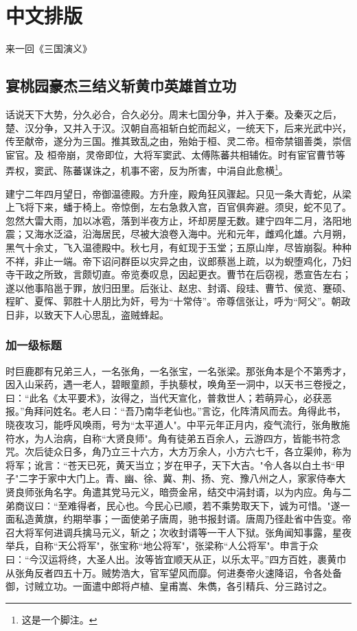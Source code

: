 \documentclass[UTF8,a4paper,twoside,zihao=-4]{ctexrep}
\begin{document}


\tableofcontents\newpage\mbox{}\thispagestyle{empty}\newpage
\clearpage{}
\chapter{中文排版}
来一回《三国演义》
\section{宴桃园豪杰三结义\quad 斩黄巾英雄首立功}
话说天下大势，分久必合，合久必分。周末七国分争，并入于秦。及秦灭之后，楚、汉分争，又并入于汉。汉朝自高祖斩白蛇而起义，一统天下，后来光武中兴，传至献帝，遂分为三国。推其致乱之由，殆始于桓、灵二帝。桓帝禁锢善类，崇信宦官。及
桓帝崩，灵帝即位，大将军窦武、太傅陈蕃共相辅佐。时有宦官曹节等弄权，窦武、陈蕃谋诛之，机事不密，反为所害，中涓自此愈横\footnote{这是一个脚注。}。

建宁二年四月望日，帝御温德殿。方升座，殿角狂风骤起。只见一条大青蛇，从梁上飞将下来，蟠于椅上。帝惊倒，左右急救入宫，百官俱奔避。须臾，蛇不见了。忽然大雷大雨，加以冰雹，落到半夜方止，坏却房屋无数。建宁四年二月，洛阳地震；又海水泛溢，沿海居民，尽被大浪卷入海中。光和元年，雌鸡化雄。六月朔，黑气十余丈，飞入温德殿中。秋七月，有虹现于玉堂；五原山岸，尽皆崩裂。种种不祥，非止一端。帝下诏问群臣以灾异之由，议郎蔡邕上疏，以为蜺堕鸡化，乃妇寺干政之所致，言颇切直。帝览奏叹息，因起更衣。曹节在后窃视，悉宣告左右；遂以他事陷邕于罪，放归田里。后张让、赵忠、封谞、段珪、曹节、侯览、蹇硕、程旷、夏恽、郭胜十人朋比为奸，号为``十常侍''。帝尊信张让，呼为``阿父''。朝政日非，以致天下人心思乱，盗贼蜂起。
\subsection{加一级标题}

时巨鹿郡有兄弟三人，一名张角，一名张宝，一名张梁。那张角本是个不第秀才，因入山采药，遇一老人，碧眼童颜，手执藜杖，唤角至一洞中，以天书三卷授之，曰：``此名《太平要术》，汝得之，当代天宣化，普救世人；若萌异心，必获恶报。''角拜问姓名。老人曰：``吾乃南华老仙也。''言讫，化阵清风而去。角得此书，晓夜攻习，能呼风唤雨，号为``太平道人"。中平元年正月内，疫气流行，张角散施符水，为人治病，自称``大贤良师"。角有徒弟五百余人，云游四方，皆能书符念咒。次后徒众日多，角乃立三十六方，大方万余人，小方六七千，各立渠帅，称为将军；讹言：``苍天已死，黄天当立；岁在甲子，天下大吉。"令人各以白土书``甲子"二字于家中大门上。青、幽、徐、冀、荆、扬、兖、豫八州之人，家家侍奉大贤良师张角名字。角遣其党马元义，暗赍金帛，结交中涓封谞，以为内应。角与二弟商议曰：``至难得者，民心也。今民心已顺，若不乘势取天下，诚为可惜。"遂一面私造黄旗，约期举事；一面使弟子唐周，驰书报封谞。唐周乃径赴省中告变。帝召大将军何进调兵擒马元义，斩之；次收封谞等一干人下狱。张角闻知事露，星夜举兵，自称``天公将军"，张宝称``地公将军"，张梁称``人公将军"。申言于众曰：``今汉运将终，大圣人出。汝等皆宜顺天从正，以乐太平。''四方百姓，裹黄巾从张角反者四五十万。贼势浩大，官军望风而靡。何进奏帝火速降诏，令各处备御，讨贼立功。一面遣中郎将卢植、皇甫嵩、朱儁，各引精兵、分三路讨之。
\end{document}
